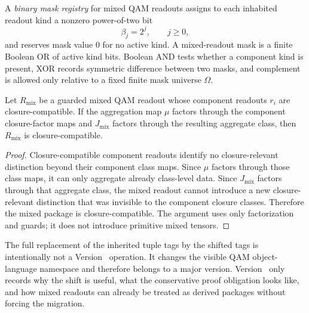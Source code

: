 \begin{definition}\label{def:binary-mask-registry-mixed-readouts}
A \emph{binary mask registry} for mixed QAM readouts assigns to each inhabited readout kind a nonzero power-of-two bit
\[
 \beta_j = 2^j,
 \qquad j\ge 0,
\]
and reserves mask value 0 for no active kind. A mixed-readout mask is a finite Boolean OR of active kind bits. Boolean AND tests whether a component kind is present, XOR records symmetric difference between two masks, and complement is allowed only relative to a fixed finite mask universe $\Omega$.
\end{definition}

\begin{proposition}\label{prop:mixed-readout-factorization}
Let $R_{\mathrm{mix}}$ be a guarded mixed QAM readout whose component readouts $r_i$ are closure-compatible. If the aggregation map $\mu$ factors through the component closure-factor maps and $J_{\mathrm{mix}}$ factors through the resulting aggregate class, then $R_{\mathrm{mix}}$ is closure-compatible.
\end{proposition}

\begin{proof}
Closure-compatible component readouts identify no closure-relevant distinction beyond their component class maps. Since $\mu$ factors through those class maps, it can only aggregate already class-level data. Since $J_{\mathrm{mix}}$ factors through that aggregate class, the mixed readout cannot introduce a new closure-relevant distinction that was invisible to the component closure classes. Therefore the mixed package is closure-compatible. The argument uses only factorization and guards; it does not introduce primitive mixed tensors.
\end{proof}

\begin{remark}\label{rem:shifted-qam-migration-trigger}
The full replacement of the inherited tuple tags by the shifted tags is intentionally not a Version~\docversion{} operation. It changes the visible QAM object-language namespace and therefore belongs to a major version. Version~\docversion{} only records why the shift is useful, what the conservative proof obligation looks like, and how mixed readouts can already be treated as derived packages without forcing the migration.
\end{remark}


